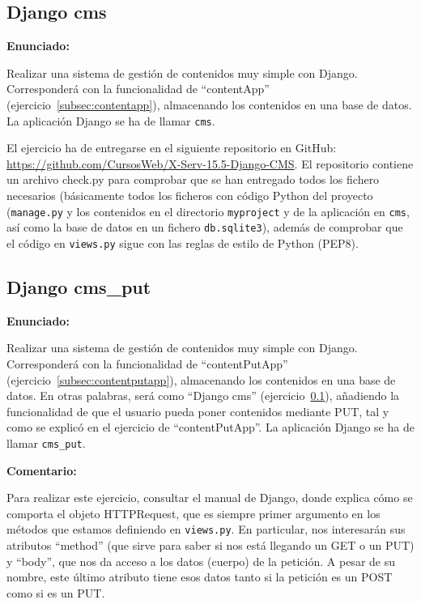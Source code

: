\subsection{Django cms}
\label{subsec:django-cms}

\textbf{Enunciado:}

Realizar una sistema de gestión de contenidos muy simple con Django. Corresponderá con la funcionalidad de ``contentApp'' (ejercicio~\ref{subsec:contentapp}), almacenando los contenidos en una base de datos. La aplicación Django se ha de llamar \texttt{cms}.

El ejercicio ha de entregarse en el siguiente repositorio en GitHub: 
\url{https://github.com/CursosWeb/X-Serv-15.5-Django-CMS}. El repositorio contiene
un archivo check.py para comprobar que se han entregado todos los fichero necesarios (básicamente todos los ficheros con código Python del proyecto (\texttt{manage.py} y los contenidos en el directorio \texttt{myproject} y de la aplicación en \texttt{cms}, así como la base de datos en un fichero \texttt{db.sqlite3}), además de comprobar que el código en
\texttt{views.py} sigue con las reglas de estilo de Python (PEP8).

%


\subsection{Django cms\_put}
\label{subsec:django-cms-put}

\textbf{Enunciado:}

Realizar una sistema de gestión de contenidos muy simple con Django. Corresponderá con la funcionalidad de ``contentPutApp'' (ejercicio~\ref{subsec:contentputapp}), almacenando los contenidos en una base de datos. En otras palabras, será como ``Django cms'' (ejercicio~\ref{subsec:django-cms}), añadiendo la funcionalidad de que el usuario pueda poner contenidos mediante PUT, tal y como se explicó en el ejercicio de ``contentPutApp''. La aplicación Django se ha de llamar \texttt{cms\_put}.


\textbf{Comentario:}

Para realizar este ejercicio, consultar el manual de Django, donde explica cómo se comporta el objeto HTTPRequest, que es siempre primer argumento en los métodos que estamos definiendo en \texttt{views.py}. En particular, nos interesarán sus atributos ``method'' (que sirve para saber si nos está llegando un GET o un PUT) y ``body'', que nos da acceso a los datos (cuerpo) de la petición. A pesar de su nombre, este último atributo tiene esos datos tanto si la petición es un POST como si es un PUT. 

